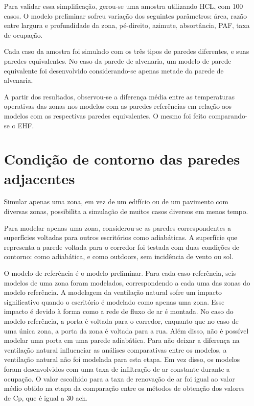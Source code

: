 \documentclass[brazil,hardcopy,openany,a5paper]{ufscthesis}
\begin{document}
	Para validar essa simplificação, gerou-se uma amostra utilizando HCL, com 100 casos. O modelo preliminar sofreu variação dos seguintes parâmetros: área, razão entre largura e profundidade da zona, pé-direito, azimute, absortância, PAF, taxa de ocupação.
	
	Cada caso da amostra foi simulado com os três tipos de paredes diferentes, e suas paredes equivalentes. No caso da parede de alvenaria, um modelo de parede equivalente foi desenvolvido considerando-se apenas metade da parede de alvenaria.
	
	A partir dos resultados, observou-se a diferença média entre as temperaturas operativas das zonas nos modelos com as paredes referências em relação aos modelos com as respectivas paredes equivalentes. O mesmo foi feito comparando-se o EHF.
	
	\section{Condição de contorno das paredes adjacentes}
	
	Simular apenas uma zona, em vez de um edifício ou de um pavimento com diversas zonas, possibilita a simulação de muitos casos diversos em menos tempo.
	
	Para modelar apenas uma zona, considerou-se as paredes correspondentes a superfícies voltadas para outros escritórios como adiabáticas. A superfície que representa a parede voltada para o corredor foi testada com duas condições de contorno: como adiabática, e como outdoors, sem incidência de vento ou sol.
	
	O modelo de referência é o modelo preliminar. Para cada caso referência, seis modelos de uma zona foram modelados, correspondendo a cada uma das zonas do modelo referência. A modelagem da ventilação natural sofre um impacto significativo quando o escritório é modelado como apenas uma zona. Esse impacto é devido à forma como a rede de fluxo de ar é montada. No caso do modelo referência, a porta é voltada para o corredor, enquanto que no caso de uma única zona, a porta da zona é voltada para a rua. Além disso, não é possível modelar uma porta em uma parede adiabática. Para não deixar a diferença na ventilação natural influenciar as análises comparativas entre os modelos, a ventilação natural não foi modelada para esta etapa. Em vez disso, os modelos foram desenvolvidos com uma taxa de infiltração de ar constante durante a ocupação. O valor escolhido para a taxa de renovação de ar foi igual ao valor médio obtido na etapa da comparação entre os métodos de obtenção dos valores de Cp, que é igual a 30 ach.
	
\end{document}
